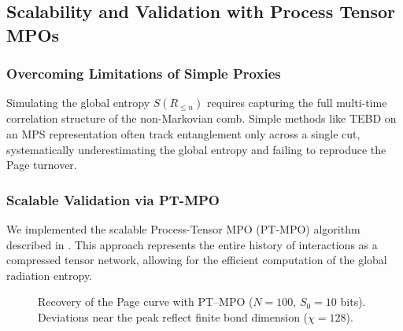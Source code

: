 \documentclass[11pt,a4paper]{article}
\theoremstyle{plain}
\theoremstyle{definition}
\theoremstyle{remark}
\begin{document}
\begin{table}[htbp]
\centering
\caption{Repetition-code fidelity vs.\ temporal noise correlation $\rho$ and error rate $p$.}
\label{tab:qec}
\vspace{0.5em}
\footnotesize
{}
\pgfplotstabletypeset{\datatableQEC}
\end{table}

\subsection{Scalability and Validation with Process Tensor MPOs}
\label{sec:mpo_mps_validation}
\subsubsection{Overcoming Limitations of Simple Proxies}
Simulating the global entropy $S(R_{\le n})$ requires capturing the full multi-time correlation structure of the non-Markovian comb. Simple methods like TEBD on an MPS representation often track entanglement only across a single cut, systematically underestimating the global entropy and failing to reproduce the Page turnover.

\subsubsection{Scalable Validation via PT-MPO}
We implemented the scalable Process-Tensor MPO (PT-MPO) algorithm described in . This approach represents the entire history of interactions as a compressed tensor network, allowing for the efficient computation of the global radiation entropy.

\begin{figure}[htbp]
\centering
{}
\caption{Recovery of the Page curve with PT--MPO ($N=100$, $S_0=10$ bits).
Deviations near the peak reflect finite bond dimension ($\chi=128$).}
\label{fig:ptmpo_page}
\end{figure}
\end{document}
